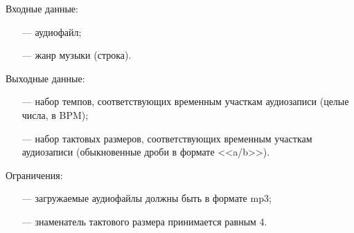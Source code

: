 Входные данные:

\begin{itemize}
	\item[---] аудиофайл;
	\item[---] жанр музыки (строка).
\end{itemize}

Выходные данные:

\begin{itemize}
	\item[---] набор темпов, соответствующих временным участкам аудиозаписи (целые числа, в BPM);
	\item[---] набор тактовых размеров, соответствующих временным участкам аудиозаписи (обыкновенные дроби в формате <<a/b>>).
\end{itemize}

Ограничения:

\begin{itemize}
	\item[---] загружаемые аудиофайлы должны быть в формате mp3;
	\item[---] знаменатель тактового размера принимается равным 4.
\end{itemize}
